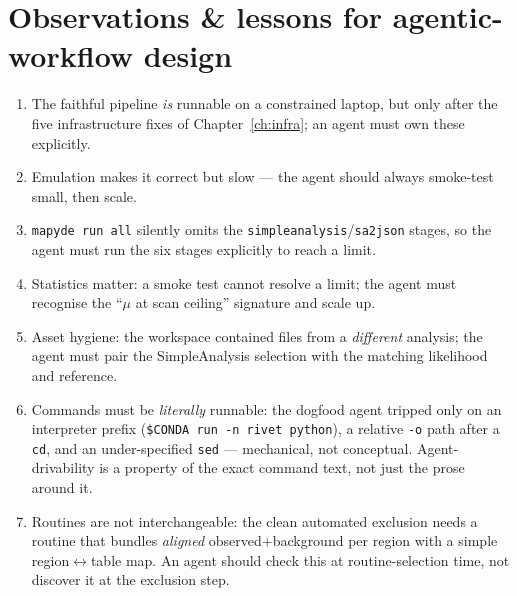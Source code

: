 \documentclass[11pt,oneside]{report}
\newcommand{\code}[1]{\texttt{#1}}
\begin{document}
\chapter{Observations \& lessons for agentic-workflow design}
\begin{enumerate}[nosep]
  \item The faithful pipeline \emph{is} runnable on a constrained laptop, but only after the five
        infrastructure fixes of Chapter~\ref{ch:infra}; an agent must own these explicitly.
  \item Emulation makes it correct but slow --- the agent should always smoke-test small, then scale.
  \item \code{mapyde run all} silently omits the \code{simpleanalysis}/\code{sa2json} stages, so the
        agent must run the six stages explicitly to reach a limit.
  \item Statistics matter: a smoke test cannot resolve a limit; the agent must recognise the
        ``$\mu$ at scan ceiling'' signature and scale up.
  \item Asset hygiene: the workspace contained files from a \emph{different} analysis; the agent
        must pair the SimpleAnalysis selection with the matching likelihood and reference.
  \item Commands must be \emph{literally} runnable: the dogfood agent tripped only on an interpreter
        prefix (\code{\$CONDA run -n rivet python}), a relative \code{-o} path after a \code{cd}, and an
        under-specified \code{sed} --- mechanical, not conceptual. Agent-drivability is a property of
        the exact command text, not just the prose around it.
  \item Routines are not interchangeable: the clean automated exclusion needs a routine that bundles
        \emph{aligned} observed+background per region with a simple region$\leftrightarrow$table map.
        An agent should check this at routine-selection time, not discover it at the exclusion step.
\end{enumerate}

\end{document}
